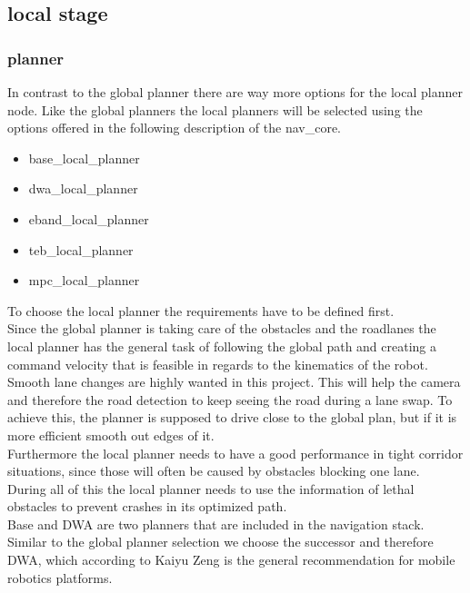 \subsection{local stage}
\subsubsection{planner}
In contrast to the global planner there are way more options for the local planner node. Like the global planners the local planners will be selected using the options offered in the following description of the nav\_core.

\begin{itemize}
	\item base\_local\_planner
	\item dwa\_local\_planner
	\item eband\_local\_planner
	\item teb\_local\_planner
	\item mpc\_local\_planner
\end{itemize}\cite{navcore}

To choose the local planner the requirements have to be defined first.\\

Since the global planner is taking care of the obstacles and the roadlanes the local planner has the general task of following the global path and creating a command velocity that is feasible in regards to the kinematics of the robot.\\

Smooth lane changes are highly wanted in this project. This will help the camera and therefore the road detection to keep seeing the road during a lane swap. To achieve this, the planner is supposed to drive close to the global plan, but if it is more efficient smooth out edges of it.\\
Furthermore the local planner needs to have a good performance in tight corridor situations, since those will often be caused by obstacles blocking one lane.\\

During all of this the local planner needs to use the information of lethal obstacles to prevent crashes in its optimized path.\\


Base and DWA are two planners that are included in the navigation stack. Similar to the global planner selection we choose the successor and therefore DWA, which according to Kaiyu Zeng is the general recommendation for mobile robotics platforms. \\

